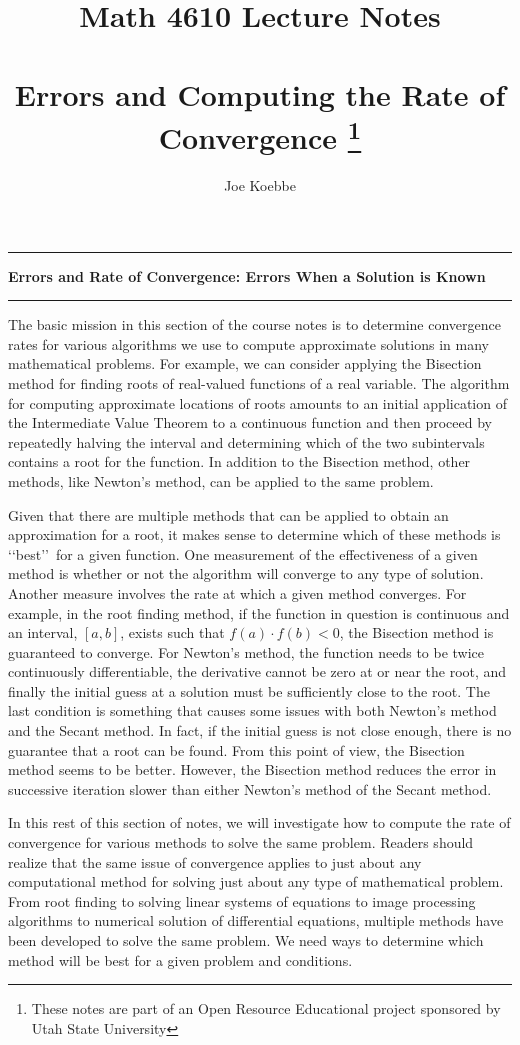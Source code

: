 \documentclass[10pt,fleqn]{article}
\title{Math 4610 Lecture Notes \\
            \ \\
        Errors and Computing the Rate of Convergence
  \footnote{These notes are part of an Open Resource Educational project
            sponsored by Utah State University}}
\author{Joe Koebbe}
\begin{document}
\maketitle
\newpage

\vskip0.1in\hrule\vskip0.1in
\noindent
{\bf Errors and Rate of Convergence: Errors When a Solution is Known}
\vskip0.1in\hrule\vskip0.1in
\noindent
The basic mission in this section of the course notes is to determine
convergence rates for various algorithms we use to compute approximate solutions
in many mathematical problems. For example, we can consider applying the
Bisection method for finding roots of real-valued functions of a real variable.
The algorithm for computing approximate locations of roots amounts to an initial
application of the Intermediate Value Theorem to a continuous function and then
proceed by repeatedly halving the interval and determining which of the two
subintervals contains a root for the function. In addition to the Bisection
method, other methods, like Newton's method, can be applied to the same problem.

Given that there are multiple methods that can be applied to obtain an 
approximation for a root, it makes sense to determine which of these methods
is \lq\lq best\rq\rq\ for a given function. One measurement of the effectiveness
of a given method is whether or not the algorithm will converge to any type of
solution. Another measure involves the rate at which a given method converges.
For example, in the root finding method, if the function in question is
continuous and an interval, $[a, b]$, exists such that $f(a)\cdot f(b)<0$, the
Bisection method is guaranteed to converge. For Newton's method, the function
needs to be twice continuously differentiable, the derivative cannot be zero at
or near the root, and finally the initial guess at a solution must be
sufficiently close to the root. The last condition is something that causes
some issues with both Newton's method and the Secant method. In fact, if the
initial guess is not close enough, there is no guarantee that a root can be
found. From this point of view, the Bisection method seems to be better.
However, the Bisection method reduces the error in successive iteration slower
than either Newton's method of the Secant method.

In this rest of this section of notes, we will investigate how to compute the
rate of convergence for various methods to solve the same problem. Readers
should realize that the same issue of convergence applies to just about any
computational method for solving just about any type of mathematical problem.
From root finding to solving linear systems of equations to image processing
algorithms to numerical solution of differential equations, multiple methods
have been developed to solve the same problem. We need ways to determine which
method will be best for a given problem and conditions.
\end{document}
